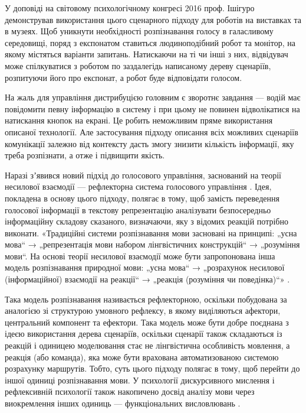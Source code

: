 У доповіді на світовому психологічному конгресі 2016 проф. Ішігуро демонстрував використання цього сценарного підходу для роботів на виставках та в музеях. Щоб уникнути необхідності розпізнавання голосу в галасливому середовищі, поряд з експонатом ставиться людиноподібний робот та монітор, на якому містяться варіанти запитань. Натискаючи на ті чи інші з них, відвідувач може спілкуватися з роботом по заздалегідь написаному дереву сценаріїв, розпитуючи його про експонат, а робот буде відповідати голосом.

На жаль для управління дистрибуцією головним є зворотнє завдання — водій має повідомити певну інформацію в систему і при цьому не повинен відволікатися на натискання кнопок на екрані. Це робить неможливим пряме використання описаної технології. Але застосування підходу описання всіх можливих сценаріїв комунікації залежно від контексту дасть змогу знизити кількість інформації, яку треба розпізнати, а отже і підвищити якість.

Наразі зʼявився новий підхід до голосового управління, заснований на теорії несилової взаємодії \cite{Teslia_2010} — рефлекторна система голосового управління \cite{Egorchenkov_2016}. Ідея, покладена в основу цього підходу, полягає в тому, щоб замість переведення голосової інформації в текстову репрезентацію аналізувати безпосередньо інформаційну складову сказаного, визначаючи, яку з відомих реакцій потрібно виконати. «Традиційні системи розпізнавання мови засновані на принципі: „усна мова“ → „репрезентація мови набором лінгвістичних конструкцій“ → „розуміння мови“. На основі теорії несилової взаємодії може бути запропонована інша модель розпізнавання природної мови: „усна мова“ → „розрахунок несилової (інформаційної) взаємодії на реакції“ → „реакція (розуміння чи поведінка)“» \cite{Teslia_2014}.

Така модель розпізнавання називається рефлекторною, оскільки побудована за аналогією зі структурою умовного рефлексу, в якому виділяються афектори, центральний компонент та ефектори. Така модель може бути добре поєднана з ідеєю використання дерева сценаріїв, оскільки сценарії також складаються із реакцій і одиницею моделювання стає не лінгвістична особливість мовлення, а реакція (або команда), яка може бути врахована автоматизованою системою розрахунку маршрутів. Тобто, суть цього підходу полягає в тому, щоб перейти до іншої одиниці розпізнавання мови. У психології дискурсивного мислення і рефлексивній психології також накопичено досвід аналізу мови через виокремлення інших одиниць — функціональних висловлювань \cite{Naydonov_2008}.

